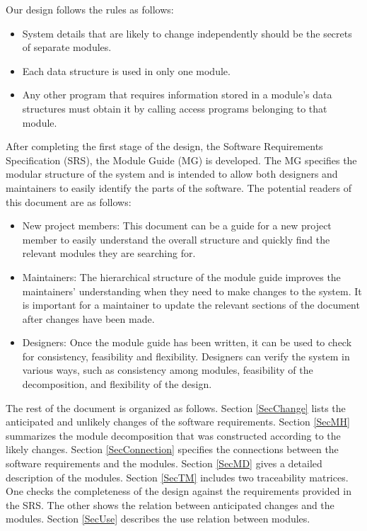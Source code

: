 \documentclass[12pt, titlepage]{article}
\begin{document}
Our design follows the rules as follows:
\begin{itemize}
\item System details that are likely to change independently should be the
  secrets of separate modules.
\item Each data structure is used in only one module.
\item Any other program that requires information stored in a module's data
  structures must obtain it by calling access programs belonging to that module.
\end{itemize}

After completing the first stage of the design, the Software Requirements
Specification (SRS), the Module Guide (MG) is developed. The MG
specifies the modular structure of the system and is intended to allow both
designers and maintainers to easily identify the parts of the software.  The
potential readers of this document are as follows:

\begin{itemize}
\item New project members: This document can be a guide for a new project member
  to easily understand the overall structure and quickly find the
  relevant modules they are searching for.
\item Maintainers: The hierarchical structure of the module guide improves the
  maintainers' understanding when they need to make changes to the system. It is
  important for a maintainer to update the relevant sections of the document
  after changes have been made.
\item Designers: Once the module guide has been written, it can be used to
  check for consistency, feasibility and flexibility. Designers can verify the
  system in various ways, such as consistency among modules, feasibility of the
  decomposition, and flexibility of the design.
\end{itemize}

The rest of the document is organized as follows. Section
\ref{SecChange} lists the anticipated and unlikely changes of the software
requirements. Section \ref{SecMH} summarizes the module decomposition that
was constructed according to the likely changes. Section \ref{SecConnection}
specifies the connections between the software requirements and the
modules. Section \ref{SecMD} gives a detailed description of the
modules. Section \ref{SecTM} includes two traceability matrices. One checks
the completeness of the design against the requirements provided in the SRS. The
other shows the relation between anticipated changes and the modules. Section
\ref{SecUse} describes the use relation between modules.
\end{document}
